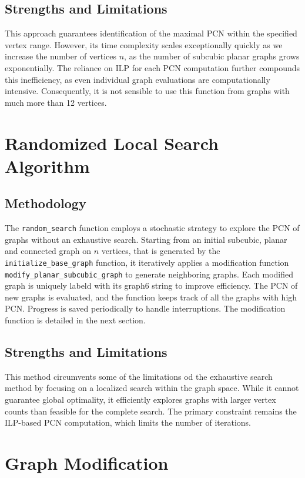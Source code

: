 \documentclass[12pt,a4paper]{amsart}
\theoremstyle{definition}
\theoremstyle{plain}
\begin{document}
\subsection{Strengths and Limitations}
This approach guarantees identification of the maximal PCN within the specified vertex range. However, its time complexity scales 
exceptionally quickly as we increase the number of vertices $n$, as the number of subcubic planar graphs grows exponentially. The 
reliance on ILP for each PCN computation further compounds this inefficiency, as even individual graph evaluations are computationally 
intensive. Consequently, it is not sensible to use this function from graphs with much more than 12 vertices. 

\section{Randomized Local Search Algorithm}
\subsection{Methodology}
The \texttt{random\_search} function employs a stochastic strategy to explore the PCN of graphs without an exhaustive search. Starting 
from an initial subcubic, planar and connected graph on $n$ vertices, that is generated by the \texttt{initialize\_base\_graph}  function, 
it iteratively applies a modification function \texttt{modify\_planar\_subcubic\_graph} to generate neighboring graphs. Each modified graph 
is uniquely labeld with its graph6 string to improve efficiency. The PCN of new graphs is evaluated, and the function keeps track of all the 
graphs with high PCN. Progress is saved periodically to handle interruptions. The modification function is detailed in the next section. 

\subsection{Strengths and Limitations}
This method circumvents some of the limitations od the exhaustive search method by focusing on a localized search within the graph space. 
While it cannot guarantee global optimality, it efficiently explores graphs with larger vertex counts than feasible for the complete search. 
The primary constraint remains the ILP-based PCN computation, which limits the number of iterations. 

\section{Graph Modification}
\end{document}
